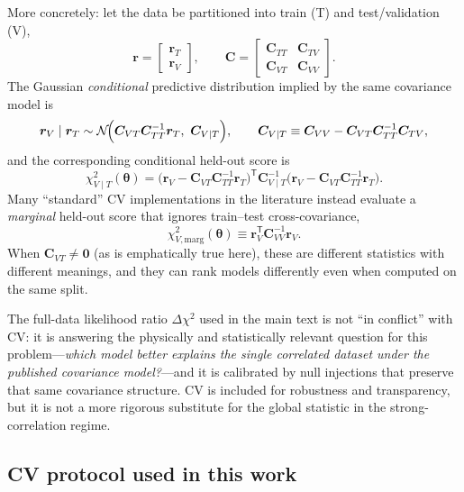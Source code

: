 \documentclass[10pt]{article}
\begin{document}
More concretely: let the data be partitioned into train (T) and test/validation (V),
\begin{equation}
\bm{r}=
\begin{bmatrix}
\bm{r}_T\\
\bm{r}_V
\end{bmatrix},
\qquad
\bm{C}=
\begin{bmatrix}
\bm{C}_{TT} & \bm{C}_{TV}\\
\bm{C}_{VT} & \bm{C}_{VV}
\end{bmatrix}.
\end{equation}
The Gaussian \emph{conditional} predictive distribution implied by the same covariance model is
\begin{equation}
\bm{r}_V \mid \bm{r}_T \sim
\mathcal{N}\!\Bigl(\bm{C}_{VT}\bm{C}_{TT}^{-1}\bm{r}_T,\ 
\bm{C}_{V\mid T}\Bigr),
\qquad
\bm{C}_{V\mid T}\equiv \bm{C}_{VV}-\bm{C}_{VT}\bm{C}_{TT}^{-1}\bm{C}_{TV},
\label{eq:cv_cond_gauss}
\end{equation}
and the corresponding conditional held-out score is
\begin{equation}
\chi^2_{V\mid T}(\bm{\theta})
=
\bigl(\bm{r}_V-\bm{C}_{VT}\bm{C}_{TT}^{-1}\bm{r}_T\bigr)^{\mathsf{T}}
\bm{C}_{V\mid T}^{-1}
\bigl(\bm{r}_V-\bm{C}_{VT}\bm{C}_{TT}^{-1}\bm{r}_T\bigr).
\label{eq:cv_cond_score}
\end{equation}
Many ``standard'' CV implementations in the literature instead evaluate a \emph{marginal} held-out
score that ignores train--test cross-covariance,
\begin{equation}
\chi^2_{V,\mathrm{marg}}(\bm{\theta}) \equiv \bm{r}_V^{\mathsf{T}}\bm{C}_{VV}^{-1}\bm{r}_V.
\label{eq:cv_marg_score}
\end{equation}
When $\bm{C}_{VT}\neq \bm{0}$ (as is emphatically true here), these are different statistics with
different meanings, and they can rank models differently even when computed on the same split.

The full-data likelihood ratio $\Delta\chi^2$ used in the main text is not ``in conflict'' with CV:
it is answering the physically and statistically relevant question for this problem---\emph{which
model better explains the single correlated dataset under the published covariance model?}---and it
is calibrated by null injections that preserve that same covariance structure. CV is included for
robustness and transparency, but it is not a more rigorous substitute for the global statistic in
the strong-correlation regime.

\subsection{CV protocol used in this work}
\label{app:cv:protocol}
\end{document}
